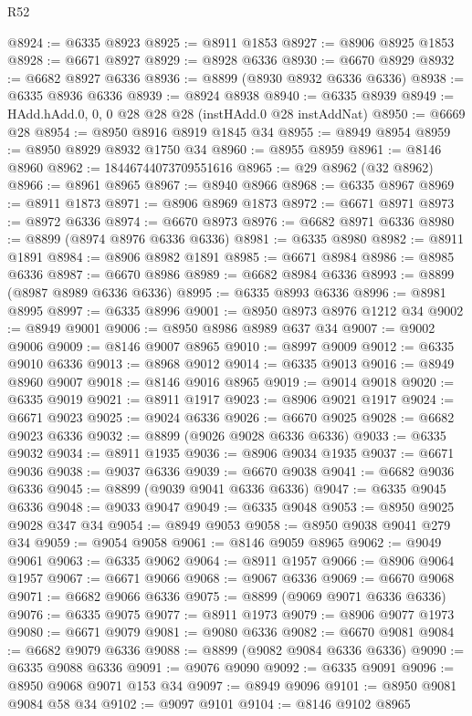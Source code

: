 \begin{lexlean}{R52}
\begin{coremodule}
@8924 := @6335 @8923
@8925 := @8911 @1853
@8927 := @8906 @8925 @1853
@8928 := @6671 @8927
@8929 := @8928 @6336
@8930 := @6670 @8929
@8932 := @6682 @8927 @6336
@8936 := @8899 (@8930 @8932 @6336 @6336)
@8938 := @6335 @8936 @6336
@8939 := @8924 @8938
@8940 := @6335 @8939
@8949 := HAdd.hAdd.{0, 0, 0} @28 @28 @28 (instHAdd.{0} @28 instAddNat)
@8950 := @6669 @28
@8954 := @8950 @8916 @8919 @1845 @34
@8955 := @8949 @8954
@8959 := @8950 @8929 @8932 @1750 @34
@8960 := @8955 @8959
@8961 := @8146 @8960
@8962 := 18446744073709551616
@8965 := @29 @8962 (@32 @8962)
@8966 := @8961 @8965
@8967 := @8940 @8966
@8968 := @6335 @8967
@8969 := @8911 @1873
@8971 := @8906 @8969 @1873
@8972 := @6671 @8971
@8973 := @8972 @6336
@8974 := @6670 @8973
@8976 := @6682 @8971 @6336
@8980 := @8899 (@8974 @8976 @6336 @6336)
@8981 := @6335 @8980
@8982 := @8911 @1891
@8984 := @8906 @8982 @1891
@8985 := @6671 @8984
@8986 := @8985 @6336
@8987 := @6670 @8986
@8989 := @6682 @8984 @6336
@8993 := @8899 (@8987 @8989 @6336 @6336)
@8995 := @6335 @8993 @6336
@8996 := @8981 @8995
@8997 := @6335 @8996
@9001 := @8950 @8973 @8976 @1212 @34
@9002 := @8949 @9001
@9006 := @8950 @8986 @8989 @637 @34
@9007 := @9002 @9006
@9009 := @8146 @9007 @8965
@9010 := @8997 @9009
@9012 := @6335 @9010 @6336
@9013 := @8968 @9012
@9014 := @6335 @9013
@9016 := @8949 @8960 @9007
@9018 := @8146 @9016 @8965
@9019 := @9014 @9018
@9020 := @6335 @9019
@9021 := @8911 @1917
@9023 := @8906 @9021 @1917
@9024 := @6671 @9023
@9025 := @9024 @6336
@9026 := @6670 @9025
@9028 := @6682 @9023 @6336
@9032 := @8899 (@9026 @9028 @6336 @6336)
@9033 := @6335 @9032
@9034 := @8911 @1935
@9036 := @8906 @9034 @1935
@9037 := @6671 @9036
@9038 := @9037 @6336
@9039 := @6670 @9038
@9041 := @6682 @9036 @6336
@9045 := @8899 (@9039 @9041 @6336 @6336)
@9047 := @6335 @9045 @6336
@9048 := @9033 @9047
@9049 := @6335 @9048
@9053 := @8950 @9025 @9028 @347 @34
@9054 := @8949 @9053
@9058 := @8950 @9038 @9041 @279 @34
@9059 := @9054 @9058
@9061 := @8146 @9059 @8965
@9062 := @9049 @9061
@9063 := @6335 @9062
@9064 := @8911 @1957
@9066 := @8906 @9064 @1957
@9067 := @6671 @9066
@9068 := @9067 @6336
@9069 := @6670 @9068
@9071 := @6682 @9066 @6336
@9075 := @8899 (@9069 @9071 @6336 @6336)
@9076 := @6335 @9075
@9077 := @8911 @1973
@9079 := @8906 @9077 @1973
@9080 := @6671 @9079
@9081 := @9080 @6336
@9082 := @6670 @9081
@9084 := @6682 @9079 @6336
@9088 := @8899 (@9082 @9084 @6336 @6336)
@9090 := @6335 @9088 @6336
@9091 := @9076 @9090
@9092 := @6335 @9091
@9096 := @8950 @9068 @9071 @153 @34
@9097 := @8949 @9096
@9101 := @8950 @9081 @9084 @58 @34
@9102 := @9097 @9101
@9104 := @8146 @9102 @8965

\end{coremodule}
\end{lexlean}

